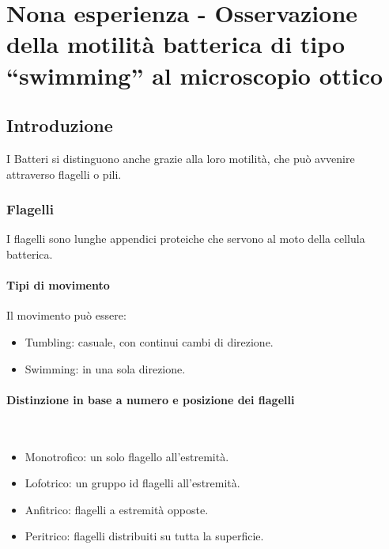 \section{Nona esperienza - Osservazione della motilit\`a batterica di tipo ``swimming'' al microscopio ottico}

	\subsection{Introduzione}
	I Batteri si distinguono anche grazie alla loro motilit\`a, che pu\`o avvenire attraverso flagelli o pili.

		\subsubsection{Flagelli}
		I flagelli sono lunghe appendici proteiche che servono al moto della cellula batterica.
			
			\paragraph{Tipi di movimento}
			Il movimento pu\`o essere:
			\begin{multicols}{2}
				\begin{itemize}
					\item Tumbling: casuale, con continui cambi di direzione.
					\item Swimming: in una sola direzione.
				\end{itemize}
			\end{multicols}

			\paragraph{Distinzione in base a numero e posizione dei flagelli}\mbox{}\\
			\begin{multicols}{2}
				\begin{itemize}
					\item Monotrofico: un solo flagello all'estremit\`a.
					\item Lofotrico: un gruppo id flagelli all'estremit\`a.
					\item Anfitrico: flagelli a estremit\`a opposte.
					\item Peritrico: flagelli distribuiti su tutta la superficie.
				\end{itemize}
			\end{multicols}

